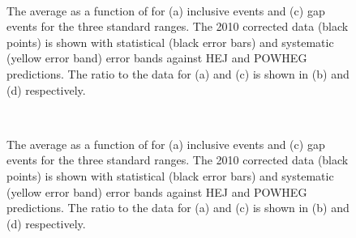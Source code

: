 \begin{figure}
\centering
\mbox{
              \quad
              \quad
                              }
\mbox{
              \quad
              \quad
                              }
\caption[]{
The average \cosdphi{} as a function of \dy{} for (a) inclusive events and (c) gap events for the three standard \dy{} ranges.  
The 2010 corrected data (black points) is shown with statistical (black error bars) and systematic (yellow error band) error bands against HEJ and POWHEG predictions.
The ratio to the data for (a) and (c) is shown in (b) and (d) respectively.
\label{GBJ2:FinalPlots:Cos}}
\end{figure}

\begin{figure}
\centering
\mbox{
              \quad
              \quad
                              }
\mbox{
              \quad
              \quad
                              }
\caption[]{
The average \costwodphi{} as a function of \dy{} for (a) inclusive events and (c) gap events for the three standard \dy{} ranges.  
The 2010 corrected data (black points) is shown with statistical (black error bars) and systematic (yellow error band) error bands against HEJ and POWHEG predictions.
The ratio to the data for (a) and (c) is shown in (b) and (d) respectively.
\label{GBJ2:FinalPlots:Cos2}}
\end{figure}



